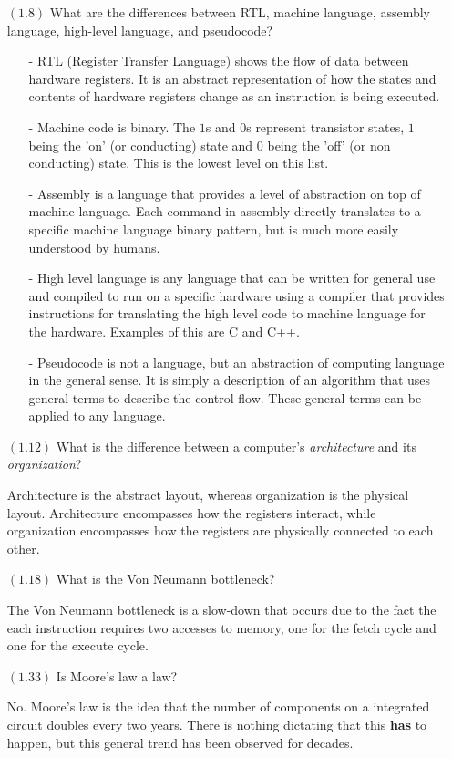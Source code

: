 \documentclass[letterpaper,10pt,titlepage]{article}
\begin{document}
\begin{enumerate}
\item[$(1.8)$] What are the differences between RTL, machine language, assembly language,
  high-level language, and pseudocode?
\begin{itemize}
	\item[-] RTL (Register Transfer Language) shows the flow of data between hardware
		registers. It is an abstract representation of how the states and contents
		of hardware registers change as an instruction is being executed.
	\item[-] Machine code is binary. The $1$s and $0$s represent transistor states,
		$1$ being the 'on' (or conducting) state and $0$ being the 'off' (or non
		conducting) state. This is the lowest level on this list.
	\item[-] Assembly is a language that provides a level of abstraction on top of
		machine language. Each command in assembly directly translates to a
		specific machine language binary pattern, but is much more easily understood by humans.
	\item[-] High level language is any language that can be written for general use
		and compiled to run on a specific hardware using a compiler that provides
		instructions for translating the high level code to machine language for
		the hardware. Examples of this are C and C++.
	\item[-] Pseudocode is not a language, but an abstraction of computing language in
		the general sense. It is simply a description of an algorithm that uses
		general terms to describe the control flow. These general terms can be
		applied to any language. 
\end{itemize}

\item[$(1.12)$]What is the difference between a computer's \textit{architecture} and its
  \textit{organization}?
\item[\textbullet] Architecture is the abstract layout, whereas organization is the
	physical layout. Architecture encompasses how the registers interact, while organization
	encompasses how the registers are physically connected to each other.

\item[$(1.18)$]What is the Von Neumann bottleneck?
\item[\textbullet] The Von Neumann bottleneck is a slow-down that occurs due to the fact
	the each instruction requires two accesses to memory, one for the fetch cycle and
	one for the execute cycle.

\item[$(1.33)$]Is Moore's law a law?
\item[\textbullet] No. Moore's law is the idea that the number of components on a
	integrated circuit doubles every two years. There is nothing dictating that this
	\textbf{has} to happen, but this general trend has been observed for decades.

\end{enumerate}
\end{document}
